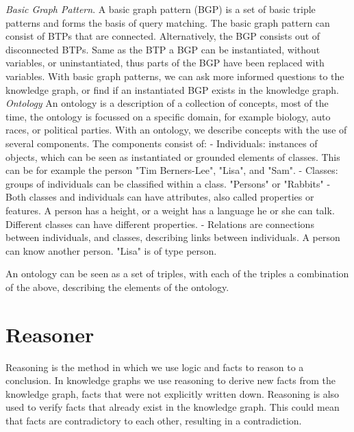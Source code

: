 \documentclass[11pt,letterpaper ,oneside ]{book}
\begin{document}
	\textit{Basic Graph Pattern}. A basic graph pattern (BGP) is a set of basic triple patterns and forms the basis of query matching. The basic graph pattern
	can consist of BTPs that are connected.
	Alternatively, the BGP consists out of disconnected BTPs. Same as the BTP a BGP can be instantiated, without variables, or uninstantiated, thus parts of the BGP have been replaced with variables. With basic graph patterns, we can ask more informed questions to the knowledge graph, or find if an instantiated BGP exists in the knowledge graph.\\
	
	\textit{Ontology} An ontology is a description of a collection of concepts, most of the time, the ontology is focussed on a specific domain, for example biology, auto races, or political parties. With an ontology, we describe concepts with the use of several components. The components consist of:
	- Individuals: instances of objects, which can be seen as instantiated or grounded elements of classes. This can be for example the person "Tim Berners-Lee", "Lisa", and "Sam".
	- Classes: groups of individuals can be classified within a class. "Persons" or "Rabbits"
	- Both classes and individuals can have attributes, also called properties or features. A person has a height, or a weight has a language he or she can talk. Different classes can have different properties. 
	- Relations are connections between individuals, and classes, describing links between individuals. A person can know another person. "Lisa" is of type person. 
	
	An ontology can be seen as a set of triples, with each of the triples a combination of the above, describing the elements of the ontology.
	
	\section{Reasoner}
	Reasoning is the method in which we use logic and facts to reason to a conclusion. In knowledge graphs we use reasoning to derive new facts from the knowledge graph, facts that were not explicitly written down. Reasoning is also used to verify facts that already exist in the knowledge graph. This could mean that facts are contradictory to each other, resulting in a contradiction.
	
	
\end{document}
